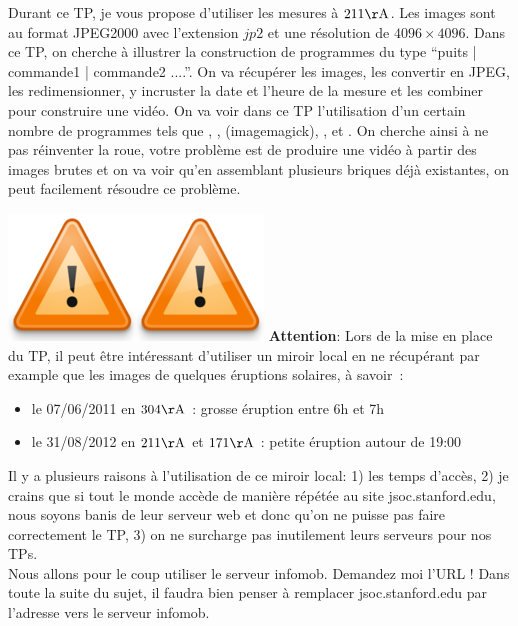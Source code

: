 Durant ce TP, je vous propose d'utiliser les mesures à $211 \si{\AA}$. Les images sont au format JPEG2000 avec l'extension $jp2$ et une résolution de $4096 \times 4096$. Dans ce TP, on cherche à illustrer la construction de programmes du type ``puits | commande1 | commande2 ....''. On va récupérer les images, les convertir en JPEG, les redimensionner, y incruster la date et l'heure de la mesure et les combiner pour construire une vidéo. On va voir dans ce TP l'utilisation d'un certain nombre de programmes tels que \bashcmd, \wget, \convert (imagemagick), \gawk, \sed et \ffmpeg. On cherche ainsi à ne pas réinventer la roue, votre problème est de produire une vidéo à partir des images brutes et on va voir qu'en assemblant plusieurs briques déjà existantes, on peut facilement résoudre ce problème.

\begin{center}
\colorbox{lblue}{\begin{minipage}{\linewidth}
\includegraphics[width=0.05\columnwidth]{Figs/warning.png}\includegraphics[width=0.05\columnwidth]{Figs/warning.png}
\textbf{Attention}: Lors de la mise en place du TP, il peut être intéressant d'utiliser un miroir local en ne récupérant par example que les images de quelques éruptions solaires, à savoir~:
\begin{itemize}
\item le 07/06/2011 en $304\si{\AA}$ : grosse éruption entre 6h et 7h
\item le 31/08/2012 en $211\si{\AA}$ et $171\si{\AA}$ : petite éruption autour de 19:00
\end{itemize}
Il y a plusieurs raisons à l'utilisation de ce miroir local: 1) les temps d'accès, 2) je crains que si tout le monde accède de manière répétée au site jsoc.stanford.edu, nous soyons banis de leur serveur web et donc qu'on ne puisse pas faire correctement le TP, 3) on ne surcharge pas inutilement leurs serveurs pour nos TPs.\\
Nous allons pour le coup utiliser le serveur infomob. Demandez moi l'URL ! Dans toute la suite du sujet, il faudra bien penser à remplacer jsoc.stanford.edu par l'adresse vers le serveur infomob.
\end{minipage}}
\end{center}


